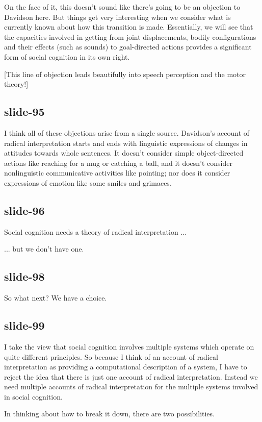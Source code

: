 \documentclass[12pt,\papersize]{extarticle}
\begin{document}
On the face of it, this doesn’t sound like there’s going to be an objection
to Davidson here.  But things get very interesting when we consider what is
currently known about how this transition is made.
Essentially, we will see that the capacities involved in getting from joint displacements,
bodily configurations and their effects (such as sounds) to goal-directed actions
provides a significant form of social cognition in its own right.

[This line of objection leads beautifully into speech perception and the motor theory!]

\subsection{slide-95}
I think all of these objections arise from a single source.
Davidson’s account of radical interpretation starts and ends with
linguistic expressions of changes in attitudes towards whole sentences.
It doesn’t consider simple object-directed actions like reaching for a mug
or catching a ball, and it doesn’t consider nonlinguistic communicative
activities like pointing; nor does it consider expressions of emotion like
some smiles and grimaces.

\subsection{slide-96}
Social cognition needs a theory of radical interpretation ...

... but we don’t have one.


\subsection{slide-98}
So what next?
We have a choice.

\subsection{slide-99}
I take the view that social cognition involves multiple systems
which operate on quite different principles.  So because I think
of an account of radical interpretation as providing a computational
description of a system, I have to reject the idea that there is just
one account of radical interpretation.
Instead we need multiple accounts of radical interpretation for
the multiple systems involved in social cognition.


In thinking about how to break it down, there are two possibilities.
\end{document}
